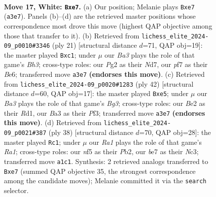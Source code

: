 \documentclass[11pt]{article}
\begin{document}
\begin{figure}[p]
\label{fig:thought-m30}
\end{figure}

\clearpage

\begin{figure}[p]\centering
\begin{subfigure}{0.46\textwidth}\centering
\resizebox{\linewidth}{!}{%
\newchessgame
\chessboard[
  setfen={r1b3k1/ppppbp1p/8/5np1/8/BPN2P2/P1PPB1PP/R5K1 w - - 2 17},
  showmover=false,
  pgfstyle=straightmove, color=movearrow, markmove={a3-e7}
]}
\caption{}
\end{subfigure}\hfill
\begin{subfigure}{0.46\textwidth}\centering
\resizebox{\linewidth}{!}{%
\newchessgame
\chessboard[
  setfen={r3k2r/pp1npp1p/2p1b1pb/8/P1N1P3/5P2/1PP3PP/R1BK1B1R b kq - 1 11},
  showmover=false,
  pgfstyle=straightmove, color=movearrow, markmove={h6-c1}
]}
\caption{}
\end{subfigure}
\\[4pt]
\begin{subfigure}{0.46\textwidth}\centering
\resizebox{\linewidth}{!}{%
\newchessgame
\chessboard[
  setfen={2k2b1r/1pp2b2/p7/2p1n1pp/4P3/2N2PB1/PPP3P1/2KR4 w - - 0 22},
  showmover=false,
  pgfstyle=straightmove, color=movearrow, markmove={g3-e5}
]}
\caption{}
\end{subfigure}\hfill
\begin{subfigure}{0.46\textwidth}\centering
\resizebox{\linewidth}{!}{%
\newchessgame
\chessboard[
  setfen={2r3k1/p2n1ppp/p3b3/3p4/3P1B2/2N2P2/PP3KPP/R7 w - - 3 20},
  showmover=false,
  pgfstyle=straightmove, color=movearrow, markmove={a1-c1}
]}
\caption{}
\end{subfigure}
\caption{\textbf{Move 17, White: \texttt{Bxe7}.} (a) Our position; Melanie plays \texttt{Bxe7} (\texttt{a3e7}). Panels (b)--(d) are the retrieved master positions whose correspondence most drove this move (highest QAP objective among those that transfer to it). (b) Retrieved from \texttt{lichess\_elite\_2024-09\_p0010\#3346} (ply 21) [structural distance $d$=71, QAP obj=19]: the master played \texttt{Bxc1}; under $\mu$ our \emph{Ba3} plays the role of that game's \emph{Bh3}; cross-type roles: our \emph{P}g2 as their \emph{N}d7, our \emph{p}f7 as their \emph{B}e6; transferred move \texttt{a3e7} \textbf{(endorses this move)}. (c) Retrieved from \texttt{lichess\_elite\_2024-09\_p0020\#1283} (ply 42) [structural distance $d$=60, QAP obj=17]: the master played \texttt{Bxe5}; under $\mu$ our \emph{Ba3} plays the role of that game's \emph{Bg3}; cross-type roles: our \emph{B}e2 as their \emph{R}d1, our \emph{B}a3 as their \emph{P}f3; transferred move \texttt{a3e7} \textbf{(endorses this move)}. (d) Retrieved from \texttt{lichess\_elite\_2024-09\_p0021\#387} (ply 38) [structural distance $d$=70, QAP obj=28]: the master played \texttt{Rc1}; under $\mu$ our \emph{Ra1} plays the role of that game's \emph{Ra1}; cross-type roles: our \emph{n}f5 as their \emph{P}b2, our \emph{b}e7 as their \emph{N}c3; transferred move \texttt{a1c1}. Synthesis: 2 retrieved analogs transferred to \texttt{Bxe7} (summed QAP objective 35, the strongest correspondence among the candidate moves); Melanie committed it via the \texttt{search} selector.}

\end{figure}
\end{document}
